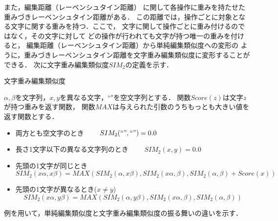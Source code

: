 また，編集距離（レーベンシュタイン距離）
に関して各操作に重みを持たせた重みづきレーベンシュタイン距離がある\cite{Kohonen95}．
この距離では，操作ごとに対象となる文字に関する重みを持つ．ここで，
文字に関して操作ごとに重み付けるのではなく，その文字に対して
どの操作が行われても文字が持つ唯一の重みを付けると，
編集距離（レーベンシュタイン距離）から単純編集類似度への変形の
ように，重みづきレーベンシュタイン距離を文字重み編集類似度に変形することが
できる．
次に文字重み編集類似度$SIM_2$の定義を示す．
\begin{df} 文字重み編集類似度

$\alpha,\beta$を文字列，$x,y$を異なる文字，``"を空文字列とする．
関数$Score(z)$は文字$z$が持つ重みを返す関数，
関数$MAX$は与えられた引数のうちもっとも大きい値を返す関数とする．
\begin{itemize}
 \item 両方とも空文字のとき~~~~
		$ SIM_2(``",``")=0.0 $
 \item 長さ1文字以下の異なる文字列のとき~~~~
		$ SIM_2(x,y)=0.0 $
 \item 先頭の1文字が同じとき
\[ SIM_2(x\alpha,x\beta)=MAX(SIM_2(\alpha,x\beta),
SIM_2(x\alpha,\beta),
SIM_2(\alpha,\beta)+Score(x)) \]
 \item 先頭の1文字が異なるとき($x \neq y$)
\[ SIM_2(x\alpha,y\beta)=MAX(SIM_2(\alpha,y\beta),
SIM_2(x\alpha,\beta),
SIM_2(\alpha,\beta)) \]
\end{itemize}
\label{sim2}
\end{df}
例を用いて，単純編集類似度と文字重み編集類似度の振る舞いの違いを示す．
